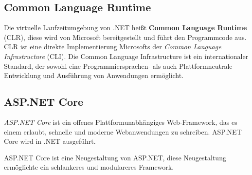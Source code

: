 \subsection{Common Language Runtime}
Die virtuelle Laufzeitumgebung von .NET heißt \textbf{Common Language Runtime} (CLR), diese wird von 
Microsoft bereitgestellt und führt den Programmcode aus.
CLR ist eine direkte Implementierung Microsofts der \textit{Common Language Infrastructure} (CLI).
Die Common Language Infrastructure ist ein internationaler Standard, der sowohl eine 
Programmiersprachen- als auch Plattformneutrale Entwicklung und Ausführung von Anwendungen ermöglicht.  

\subsection{ASP.NET Core}
\textit{ASP.NET Core} ist ein offenes Plattformunabhängiges Web-Framework, das es einem erlaubt,
schnelle und moderne Webanwendungen zu schreiben. ASP.NET Core wird in .NET ausgeführt.

ASP.NET Core ist eine Neugestaltung von ASP.NET, diese Neugestaltung ermöglichte ein 
schlankeres und modulareres Framework. 